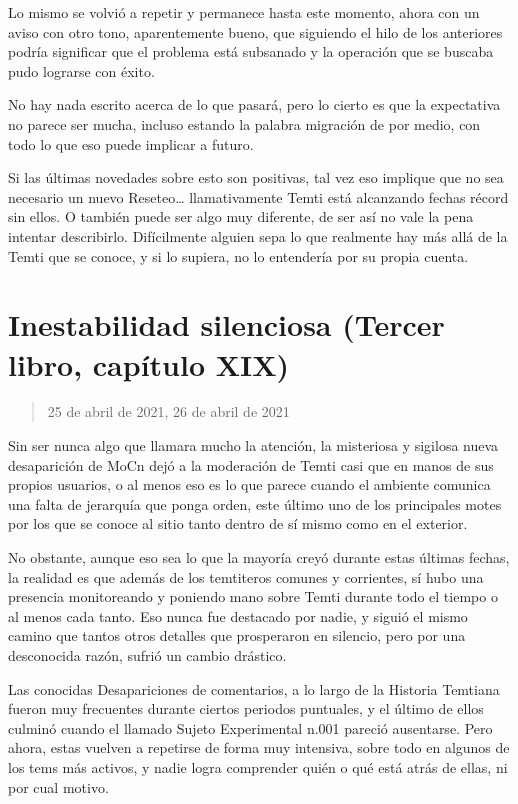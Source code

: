 \documentclass[
]{book}
\begin{document}
Lo mismo se volvió a repetir y permanece hasta este momento, ahora con un aviso con otro tono, aparentemente bueno, que siguiendo el hilo de los anteriores podría significar que el problema está subsanado y la operación que se buscaba pudo lograrse con éxito.

No hay nada escrito acerca de lo que pasará, pero lo cierto es que la expectativa no parece ser mucha, incluso estando la palabra migración de por medio, con todo lo que eso puede implicar a futuro.

Si las últimas novedades sobre esto son positivas, tal vez eso implique que no sea necesario un nuevo Reseteo\ldots{} llamativamente Temti está alcanzando fechas récord sin ellos. O también puede ser algo muy diferente, de ser así no vale la pena intentar describirlo. Difícilmente alguien sepa lo que realmente hay más allá de la Temti que se conoce, y si lo supiera, no lo entendería por su propia cuenta.

\hypertarget{inestabilidad-silenciosa-tercer-libro-capuxedtulo-xix}{%
\section{Inestabilidad silenciosa (Tercer libro, capítulo XIX)}\label{inestabilidad-silenciosa-tercer-libro-capuxedtulo-xix}}

\begin{quote}
25 de abril de 2021, 26 de abril de 2021
\end{quote}

Sin ser nunca algo que llamara mucho la atención, la misteriosa y sigilosa nueva desaparición de MoCn dejó a la moderación de Temti casi que en manos de sus propios usuarios, o al menos eso es lo que parece cuando el ambiente comunica una falta de jerarquía que ponga orden, este último uno de los principales motes por los que se conoce al sitio tanto dentro de sí mismo como en el exterior.

No obstante, aunque eso sea lo que la mayoría creyó durante estas últimas fechas, la realidad es que además de los temtiteros comunes y corrientes, sí hubo una presencia monitoreando y poniendo mano sobre Temti durante todo el tiempo o al menos cada tanto. Eso nunca fue destacado por nadie, y siguió el mismo camino que tantos otros detalles que prosperaron en silencio, pero por una desconocida razón, sufrió un cambio drástico.

Las conocidas Desapariciones de comentarios, a lo largo de la Historia Temtiana fueron muy frecuentes durante ciertos periodos puntuales, y el último de ellos culminó cuando el llamado Sujeto Experimental n.001 pareció ausentarse. Pero ahora, estas vuelven a repetirse de forma muy intensiva, sobre todo en algunos de los tems más activos, y nadie logra comprender quién o qué está atrás de ellas, ni por cual motivo.
\end{document}
